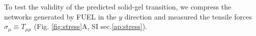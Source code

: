 \documentclass[nofootinbib,preprint,floatfix,titlepage,endfloats,superscriptaddress]{revtex4} %
\newcommand{\outNim}[1]{}
\begin{document}
To test the validity of the predicted solid-gel transition,
we compress the networks generated by FUEL in the $y$ direction and measured the tensile forces 
$ \sigma_\mu \equiv T_{\mu\mu}$ (Fig. \ref{fig:stress}A, SI sec.\ref{ap:stress}). 
\outNim{
If the stress components $\sigma_x, \sigma_y$ and $\sigma_z$ have similar magnitude, as in hydrostatics, we have $ \sigma_\parallel ={1\over L^3} \int_\mathrm{net} d^3x |\sigma_y| = p$ and $\sigma_\perp = {1\over L^3} \int_\mathrm{net} d^3x \sqrt{\sigma_x^2+ \sigma_z^2} = \sqrt{2} p$, consequently
 $ \sigma_\parallel/\sigma_\perp = 1/\sqrt{2}$.
If, however, the $ \sigma_\parallel/\sigma_\perp$ ratio varies as we rotate the layout, the network possesses solid-like properties. 
}
\begin{figure}
    \centering
    

\end{figure}
\end{document}

